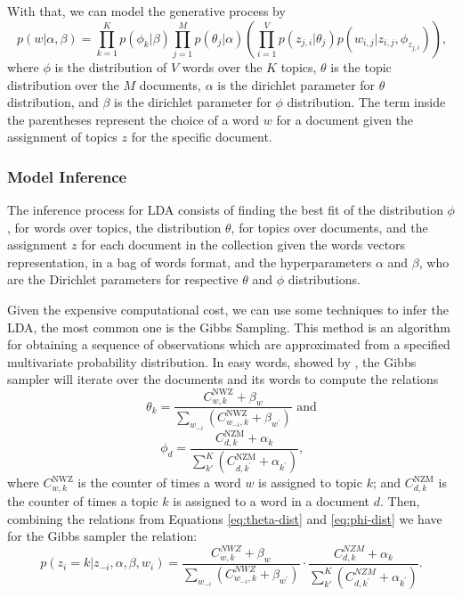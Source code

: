 	With that, we can model the generative process by
	\begin{equation}
		\label{eq:generative-lda}
		p(w|\alpha, \beta) = \prod_{k=1}^{K} p(\phi_{k}|\beta) \prod_{j=1}^{M} p(\theta_{j}|\alpha) \left( \prod_{i=1}^{V}p(z_{j,i}|\theta_{j}) p(w_{i,j}|z_{i,j},\phi_{z_{j,i}})  \right) \text{,}
	\end{equation}
	where $\phi$ is the distribution of $V$ words over the $K$ topics, $\theta$ is the topic distribution over the $M$ documents, $\alpha$ is the dirichlet parameter for $\theta$ distribution, and $\beta$ is the dirichlet parameter for $\phi$ distribution. The term inside the parentheses represent the choice of a word $w$ for a document given the assignment of topics $z$ for the specific document.

	\subsubsection{Model Inference}

	The inference process for LDA consists of finding the best fit of the distribution $\phi$, for words over topics, the distribution $\theta$, for topics over documents, and the assignment $z$ for each document in the collection given the words vectors representation, in a bag of words format, and the hyperparameters $\alpha$ and $\beta$, who are the Dirichlet parameters for respective $\theta$ and $\phi$ distributions.

	Given the expensive computational cost, we can use some techniques to infer the LDA, the most common one is the Gibbs Sampling. This method is an algorithm for obtaining a sequence of observations which are approximated from a specified multivariate probability distribution. In easy words, showed by , the Gibbs sampler will iterate over the documents and its words to compute the relations
	\begin{equation}
		\label{eq:theta-dist}
		\theta_{k} = \frac{C_{w,k}^{\text{NWZ}} + \beta_{w}} {\sum_{w_{-i}} \left(C_{w_{-i},k}^{\text{NWZ}}
    + \beta_{w^{'}} \right)} \text{ and}
	\end{equation}
	\begin{equation}
		\label{eq:phi-dist}
		\phi_{d} = \frac{C_{d,k}^{\text{NZM}} + \alpha_{k}} {\sum_{k'}^{K} \left(C_{d,k^{'}}^{\text{NZM}} + \alpha_{k^{'}} \right)} \text{,}
	\end{equation}
	where $C_{w,k}^{\text{NWZ}}$ is the counter of times a word $w$ is assigned to topic $k$; and $C_{d,k}^{\text{NZM}}$ is the counter of times a topic $k$ is assigned to a word in a document $d$. Then, combining the relations from Equations \ref{eq:theta-dist} and \ref{eq:phi-dist} we have for the Gibbs sampler the relation:
	\begin{equation}
		\label{eq:gibbs-sampler}
		p(z_{i}=k|z_{-i}, \alpha, \beta, w_{i}) = \frac{C_{w,k}^{NWZ} + \beta_{w}} {\sum_{w_{-i}} \left(C_{w_{-i},k}^{NWZ} + \beta_{w^{'}} \right)} \cdot \frac{C_{d,k}^{NZM} + \alpha_{k}} {\sum_{k'}^{K} \left(C_{d,k^{'}}^{NZM} + \alpha_{k^{'}} \right)}\text{.}
	\end{equation}

